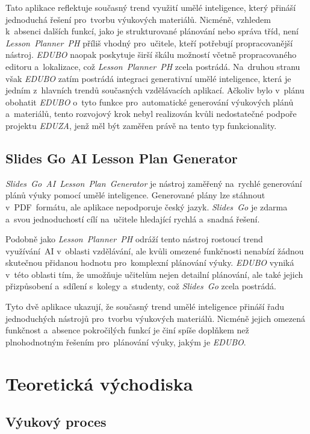 \documentclass[male,czech,api_bc]{kitheses}
\begin{document}
Tato aplikace reflektuje současný trend využití umělé inteligence, který přináší jednoduchá řešení pro~tvorbu výukových materiálů. Nicméně, vzhledem k~absenci dalších funkcí, jako je strukturované plánování nebo správa tříd, není \textit{Lesson~Planner~PH} příliš vhodný pro~učitele, kteří potřebují propracovanější nástroj. \textit{EDUBO} naopak poskytuje širší škálu možností včetně propracovaného editoru a~lokalizace, což \textit{Lesson~Planner~PH} zcela postrádá. Na~druhou stranu však \textit{EDUBO} zatím postrádá integraci generativní umělé inteligence, která je jedním z~hlavních trendů současných vzdělávacích aplikací. Ačkoliv bylo v~plánu obohatit \textit{EDUBO} o~tyto funkce pro~automatické generování výukových plánů a~materiálů, tento rozvojový krok nebyl realizován kvůli nedostatečné podpoře projektu \textit{EDUZA}, jenž měl být zaměřen právě na tento typ funkcionality.

\section{Slides Go AI Lesson Plan Generator}

\textit{Slides~Go~AI~Lesson~Plan~Generator} je nástroj zaměřený na~rychlé generování plánů výuky pomocí umělé inteligence. Generované plány lze stáhnout v~PDF~formátu, ale aplikace nepodporuje český jazyk. \textit{Slides~Go} je zdarma a~svou jednoduchostí cílí na~učitele hledající rychlá a~snadná řešení.

Podobně jako \textit{Lesson~Planner~PH} odráží tento nástroj rostoucí trend využívání~AI v~oblasti vzdělávání, ale kvůli omezené funkčnosti nenabízí žádnou skutečnou přidanou hodnotu pro~komplexní plánování výuky. \textit{EDUBO} vyniká v~této oblasti tím, že umožňuje učitelům nejen detailní plánování, ale také jejich přizpůsobení a~sdílení s~kolegy a~studenty, což \textit{Slides~Go} zcela postrádá.

Tyto dvě aplikace ukazují, že současný trend umělé inteligence přináší řadu jednoduchých nástrojů pro~tvorbu výukových materiálů. Nicméně jejich omezená funkčnost a~absence pokročilých funkcí je činí spíše doplňkem než plnohodnotným řešením pro~plánování výuky, jakým je \textit{EDUBO}.

\chapter{Teoretická východiska}
\section{Výukový proces}
\end{document}
